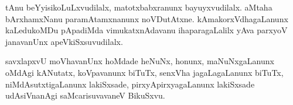\documentclass{article}
\begin{document}
\begin{mn}%
tAnu beYyisikoLuLxvudilalx, matotxbabxranunx bayuyxvudilalx. aMtaha
bArxhamxNanu paramAtamxnanunx noVDutAtxne. kAmakorxVdhagaLanunx
kaLedukoMDu pApadiMda vimukatxnAdavanu ihaparagaLalilx yAva parxyoV
janavanUnx apeVkiSxsuvudilalx.
\end{mn}

\begin{mn}
savxlapxvU moVhavanUnx hoMdade heNuNx, honunx, maNuNxgaLanunx oMdAgi
kANutatx, koVpavanunx biTuTx, senxVha jagaLagaLanunx biTuTx,
niMdAsutxtigaLanunx lakiSxsade, pirxyApirxyagaLanunx lakiSxsade
udAsiVnanAgi saMcarisuvavaneV BikuSxvu.
\end{mn}

%
%

\end{document}
